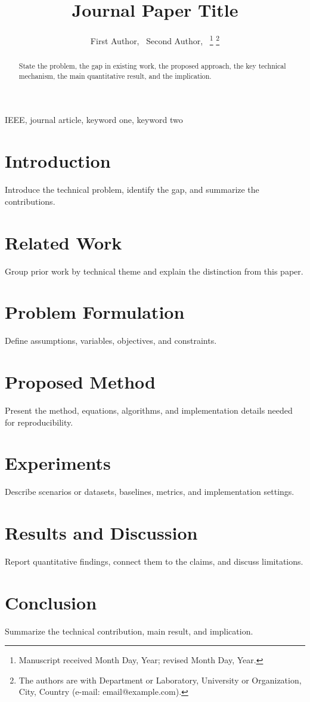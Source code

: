\documentclass[journal]{IEEEtran}
\title{Journal Paper Title}
\author{First Author,~\IEEEmembership{Member,~IEEE,}
Second Author,~\IEEEmembership{Member,~IEEE}
\thanks{Manuscript received Month Day, Year; revised Month Day, Year.}
\thanks{The authors are with Department or Laboratory, University or Organization, City, Country (e-mail: email@example.com).}}
\begin{document}
\maketitle

\begin{abstract}
State the problem, the gap in existing work, the proposed approach, the key technical mechanism, the main quantitative result, and the implication.
\end{abstract}

\begin{IEEEkeywords}
IEEE, journal article, keyword one, keyword two
\end{IEEEkeywords}

\section{Introduction}
Introduce the technical problem, identify the gap, and summarize the contributions.

\section{Related Work}
Group prior work by technical theme and explain the distinction from this paper.

\section{Problem Formulation}
Define assumptions, variables, objectives, and constraints.

\section{Proposed Method}
Present the method, equations, algorithms, and implementation details needed for reproducibility.

\section{Experiments}
Describe scenarios or datasets, baselines, metrics, and implementation settings.

\section{Results and Discussion}
Report quantitative findings, connect them to the claims, and discuss limitations.

\section{Conclusion}
Summarize the technical contribution, main result, and implication.



\end{document}
